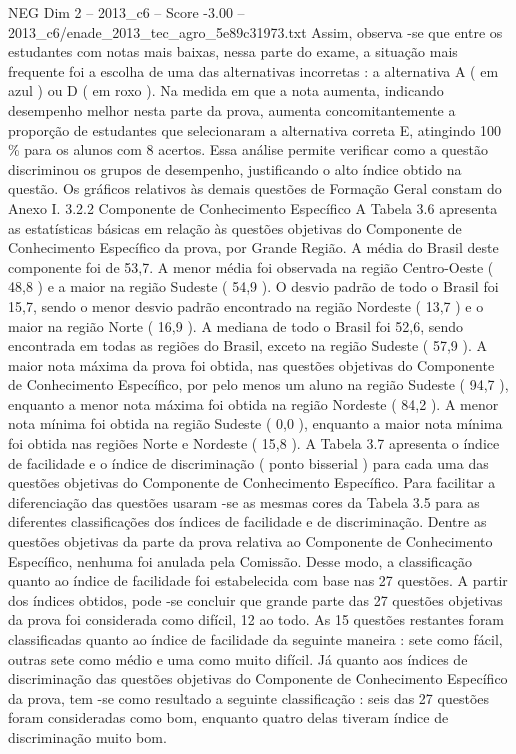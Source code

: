 \begin{textsample}{NEG Dim 2 – 2013\_c6 – Score -3.00 – 2013\_c6/enade\_2013\_tec\_agro\_5e89c31973.txt}
Assim, observa -se que entre os estudantes com notas mais baixas, nessa parte do exame, a situação mais frequente foi a escolha de uma das alternativas incorretas : a alternativa A ( em azul ) ou D ( em roxo ).
Na medida em que a nota aumenta, indicando desempenho melhor nesta parte da prova, aumenta concomitantemente a proporção de estudantes que selecionaram a alternativa correta E, atingindo 100 \% para os alunos com 8 acertos.
Essa análise permite verificar como a questão discriminou os grupos de desempenho, justificando o alto índice obtido na questão.
Os gráficos relativos às demais questões de Formação Geral constam do Anexo I. 3.2.2 Componente de Conhecimento Específico A Tabela 3.6 apresenta as estatísticas básicas em relação às questões objetivas do Componente de Conhecimento Específico da prova, por Grande Região.
A média do Brasil deste componente foi de 53,7.
A menor média foi observada na região Centro-Oeste ( 48,8 ) e a maior na região Sudeste ( 54,9 ).
O desvio padrão de todo o Brasil foi 15,7, sendo o menor desvio padrão encontrado na região Nordeste ( 13,7 ) e o maior na região Norte ( 16,9 ).
A mediana de todo o Brasil foi 52,6, sendo encontrada em todas as regiões do Brasil, exceto na região Sudeste ( 57,9 ).
A maior nota máxima da prova foi obtida, nas questões objetivas do Componente de Conhecimento Específico, por pelo menos um aluno na região Sudeste ( 94,7 ), enquanto a menor nota máxima foi obtida na região Nordeste ( 84,2 ).
A menor nota mínima foi obtida na região Sudeste ( 0,0 ), enquanto a maior nota mínima foi obtida nas regiões Norte e Nordeste ( 15,8 ).
A Tabela 3.7 apresenta o índice de facilidade e o índice de discriminação ( ponto bisserial ) para cada uma das questões objetivas do Componente de Conhecimento Específico.
Para facilitar a diferenciação das questões usaram -se as mesmas cores da Tabela 3.5 para as diferentes classificações dos índices de facilidade e de discriminação.
Dentre as questões objetivas da parte da prova relativa ao Componente de Conhecimento Específico, nenhuma foi anulada pela Comissão.
Desse modo, a classificação quanto ao índice de facilidade foi estabelecida com base nas 27 questões.
A partir dos índices obtidos, pode -se concluir que grande parte das 27 questões objetivas da prova foi considerada como difícil, 12 ao todo.
As 15 questões restantes foram classificadas quanto ao índice de facilidade da seguinte maneira : sete como fácil, outras sete como médio e uma como muito difícil.
Já quanto aos índices de discriminação das questões objetivas do Componente de Conhecimento Específico da prova, tem -se como resultado a seguinte classificação : seis das 27 questões foram consideradas como bom, enquanto quatro delas tiveram índice de discriminação muito bom.

\end{textsample}
